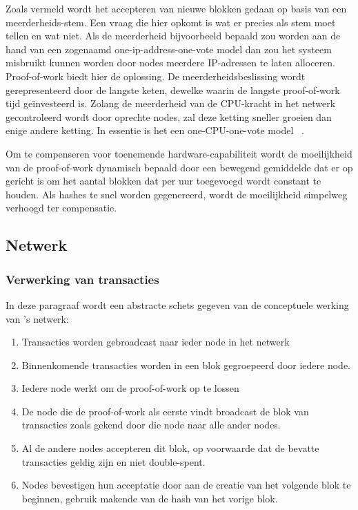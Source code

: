 	Zoals vermeld wordt het accepteren van nieuwe blokken gedaan op basis van een meerderheids-stem. Een vraag die hier opkomt is wat er precies als stem moet tellen en wat niet. Als de meerderheid bijvoorbeeld bepaald zou worden aan de hand van een zogenaamd one-ip-address-one-vote model dan zou het systeem misbruikt kunnen worden door nodes meerdere IP-adressen te laten alloceren. Proof-of-work biedt hier de oplossing. De meerderheidsbeslissing wordt gerepresenteerd door de langste keten, dewelke waarin de langste proof-of-work tijd geïnvesteerd is. Zolang de meerderheid van de CPU-kracht in het netwerk gecontroleerd wordt door oprechte nodes, zal deze ketting sneller groeien dan enige andere ketting. In essentie is het een one-CPU-one-vote model ~\autocite{Nakamoto2008}.
	
	Om te compenseren voor toenemende hardware-capabiliteit wordt de moeilijkheid van de proof-of-work dynamisch bepaald door een bewegend gemiddelde dat er op gericht is om het aantal blokken dat per uur toegevoegd wordt constant te houden. Als hashes te snel worden gegenereerd, wordt de moeilijkheid simpelweg verhoogd ter compensatie. 
	\subsection{Netwerk}
		\subsubsection{Verwerking  van transacties}
		In deze paragraaf wordt een abstracte schets gegeven van de conceptuele werking van \textcite{Nakamoto2008}’s netwerk:
		\begin{enumerate}
			\item Transacties worden gebroadcast naar ieder node in het netwerk
			\item Binnenkomende transacties worden in een blok gegroepeerd door iedere node.
			\item Iedere node werkt om de proof-of-work op te lossen
			\item De node die de proof-of-work als eerste vindt broadcast de blok van transacties zoals gekend door die node naar alle ander nodes.
			\item Al de andere nodes accepteren dit blok, op voorwaarde dat de bevatte transacties geldig zijn en niet double-spent.
			\item Nodes bevestigen hun acceptatie door aan de creatie van het volgende blok te beginnen, gebruik makende van de hash van het vorige blok.
		\end{enumerate}
